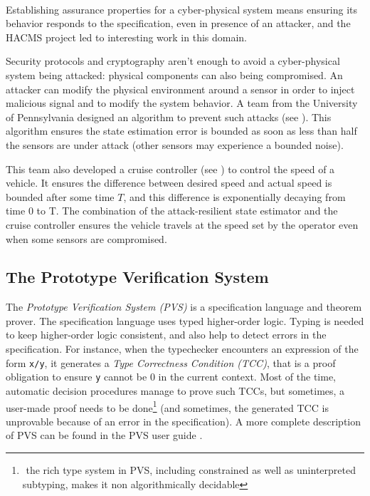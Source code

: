 \paragraph{ }
Establishing assurance properties for a cyber-physical system means ensuring its behavior responds to the specification, even in presence of an attacker, and the HACMS project led to interesting work in this domain.

Security protocols and cryptography aren't enough to avoid a cyber-physical system being attacked: physical components can also being compromised.
An attacker can modify the physical environment around a sensor in order to inject malicious signal and to modify the system behavior.
A team from the University of Pennsylvania designed an algorithm to prevent such attacks (see \cite{StateEstimator}).
This algorithm ensures the state estimation error is bounded as soon as less than half the sensors are under attack (other sensors may experience a bounded noise).

This team also developed a cruise controller (see \cite{CruiseControl}) to control the speed of a vehicle. 
It ensures the difference between desired speed and actual speed is bounded after some time $T$, and this difference is exponentially decaying from time 0 to T.
The combination of the attack-resilient state estimator and the cruise controller ensures the vehicle travels at the speed set by the operator even when some sensors are compromised.



\subsection{The Prototype Verification System}

The \emph{Prototype Verification System (PVS)} is a specification language and theorem prover. The specification language uses typed higher-order logic.
Typing is needed to keep higher-order logic consistent, and also help to detect errors in the specification.
For instance, when the typechecker encounters an expression of the form \texttt{x/y}, it generates a \emph{Type Correctness Condition (TCC)}, that is a proof obligation to ensure \texttt{y} cannot be 0 in the current context.
Most of the time, automatic decision procedures manage to prove such TCCs, but sometimes, a user-made proof needs to be done\footnote{$ $
the rich type system in PVS, including constrained as well as uninterpreted subtyping, makes it non algorithmically decidable}
(and sometimes, the generated TCC is unprovable because of an error in the specification).
A more complete description of PVS can be found in the PVS user guide \cite{PVS:userguide}.

